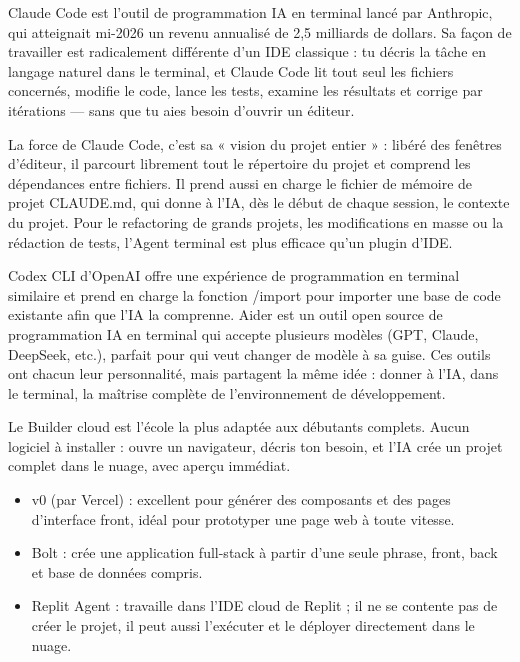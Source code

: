 
Claude Code est l'outil de programmation IA en terminal lancé par Anthropic, qui atteignait mi-2026 un revenu annualisé de 2,5 milliards de dollars. Sa façon de travailler est radicalement différente d'un IDE classique : tu décris la tâche en langage naturel dans le terminal, et Claude Code lit tout seul les fichiers concernés, modifie le code, lance les tests, examine les résultats et corrige par itérations — sans que tu aies besoin d'ouvrir un éditeur.

La force de Claude Code, c'est sa « vision du projet entier » : libéré des fenêtres d'éditeur, il parcourt librement tout le répertoire du projet et comprend les dépendances entre fichiers. Il prend aussi en charge le fichier de mémoire de projet CLAUDE.md, qui donne à l'IA, dès le début de chaque session, le contexte du projet. Pour le refactoring de grands projets, les modifications en masse ou la rédaction de tests, l'Agent terminal est plus efficace qu'un plugin d'IDE.


Codex CLI d'OpenAI offre une expérience de programmation en terminal similaire et prend en charge la fonction /import pour importer une base de code existante afin que l'IA la comprenne. Aider est un outil open source de programmation IA en terminal qui accepte plusieurs modèles (GPT, Claude, DeepSeek, etc.), parfait pour qui veut changer de modèle à sa guise. Ces outils ont chacun leur personnalité, mais partagent la même idée : donner à l'IA, dans le terminal, la maîtrise complète de l'environnement de développement.


Le Builder cloud est l'école la plus adaptée aux débutants complets. Aucun logiciel à installer : ouvre un navigateur, décris ton besoin, et l'IA crée un projet complet dans le nuage, avec aperçu immédiat.

\begin{itemize}
  \item v0 (par Vercel) : excellent pour générer des composants et des pages d'interface front, idéal pour prototyper une page web à toute vitesse.
  \item Bolt : crée une application full-stack à partir d'une seule phrase, front, back et base de données compris.
  \item Replit Agent : travaille dans l'IDE cloud de Replit ; il ne se contente pas de créer le projet, il peut aussi l'exécuter et le déployer directement dans le nuage.
\end{itemize}

